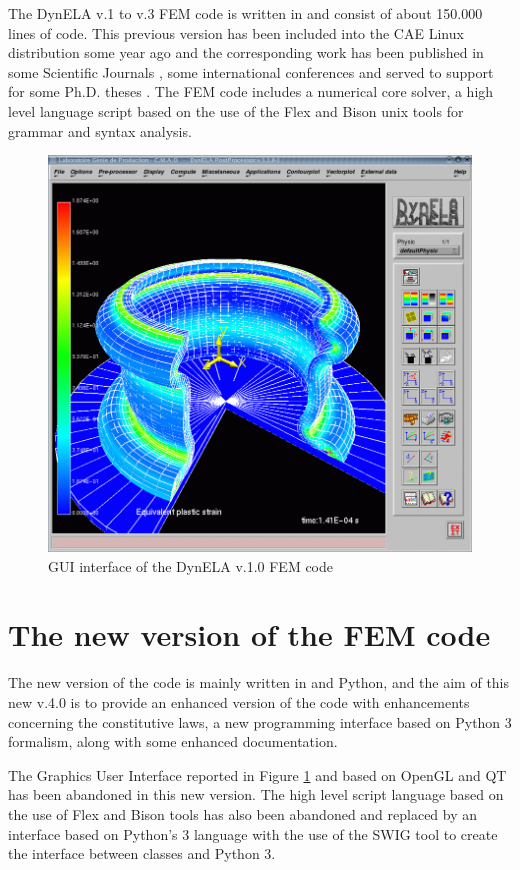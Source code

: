 The DynELA v.1 to v.3 FEM code is written in \Cpp and consist of about 150.000 lines of code. This previous version has been included into the CAE Linux distribution some year ago and the corresponding work has been published in some Scientific Journals \cite{
pantale_object-oriented_2002,
pantale_development_2004,
pantale_parallelization_2005,
menanteau_methodology_2006,
nistor_numerical_2007,
nistor_numerical_2008,
pantale_rp_2020}
, some international conferences \cite{
menanteau_coupled_2005,
nistor_modeling_2005,
pantale_strategies_2005,
pantale_developpement_2004,
pantale_developpement_1999,
pantale_development_2002}
 and served to support for some Ph.D. theses \cite{
menanteau_developpement_2004,
nistor_identification_2005}
. The FEM code includes a numerical core solver, a high level language script based on the use of the Flex and Bison unix tools for grammar and syntax analysis.

\begin{figure}[h]
\begin{centering}
\includegraphics[width=0.5\columnwidth]{Figures/DynELA-v.1.1}
\par\end{centering}
\caption{GUI interface of the DynELA v.1.0 FEM code\label{fig:History!DynELAv1}}
\end{figure}

\section{The new version of the FEM code}
The new version of the code is mainly written in \Cpp and Python, and the aim of this new v.4.0 is to provide an enhanced version of the code with enhancements concerning the constitutive laws, a new programming interface based on Python 3 formalism, along with some enhanced documentation.

The Graphics User Interface reported in Figure \ref{fig:History!DynELAv1} and based on OpenGL and QT has been abandoned in this new version. The high level script language based on the use of Flex and Bison tools has also been abandoned and replaced by an interface based on Python's 3 language with the use of the SWIG tool to create the interface between \Cpp classes and Python 3.
